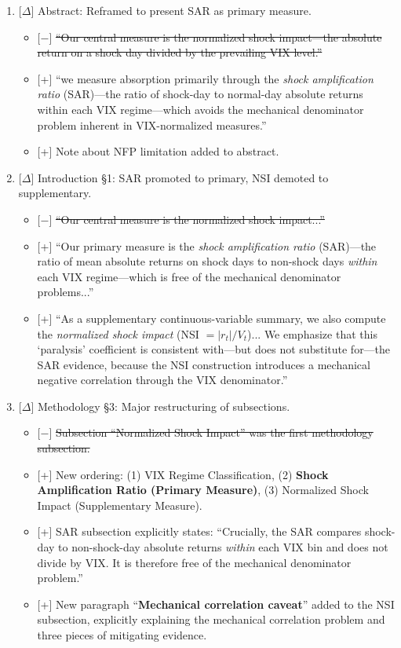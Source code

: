 \documentclass[12pt,a4paper]{article}
\newcommand{\added}[1]{\textcolor{addgreen}{[+] #1}}
\newcommand{\deleted}[1]{\textcolor{delred}{[$-$] \st{#1}}}
\newcommand{\modified}[1]{\textcolor{modblue}{[$\Delta$] #1}}
\begin{document}
\begin{enumerate}[leftmargin=*]

\item \modified{Abstract: Reframed to present SAR as primary measure.}
\begin{itemize}
\item \deleted{``Our central measure is the normalized shock impact---the absolute return on a shock day divided by the prevailing VIX level.''}
\item \added{``we measure absorption primarily through the \textit{shock amplification ratio} (SAR)---the ratio of shock-day to normal-day absolute returns within each VIX regime---which avoids the mechanical denominator problem inherent in VIX-normalized measures.''}
\item \added{Note about NFP limitation added to abstract.}
\end{itemize}

\item \modified{Introduction \S1: SAR promoted to primary, NSI demoted to supplementary.}
\begin{itemize}
\item \deleted{``Our central measure is the normalized shock impact...''}
\item \added{``Our primary measure is the \textit{shock amplification ratio} (SAR)---the ratio of mean absolute returns on shock days to non-shock days \textit{within} each VIX regime---which is free of the mechanical denominator problems...''}
\item \added{``As a supplementary continuous-variable summary, we also compute the \textit{normalized shock impact} (NSI $= |r_t|/V_t$)... We emphasize that this `paralysis' coefficient is consistent with---but does not substitute for---the SAR evidence, because the NSI construction introduces a mechanical negative correlation through the VIX denominator.''}
\end{itemize}

\item \modified{Methodology \S3: Major restructuring of subsections.}
\begin{itemize}
\item \deleted{Subsection ``Normalized Shock Impact'' was the first methodology subsection.}
\item \added{New ordering: (1) VIX Regime Classification, (2) \textbf{Shock Amplification Ratio (Primary Measure)}, (3) Normalized Shock Impact (Supplementary Measure).}
\item \added{SAR subsection explicitly states: ``Crucially, the SAR compares shock-day to non-shock-day absolute returns \textit{within} each VIX bin and does not divide by VIX. It is therefore free of the mechanical denominator problem.''}
\item \added{New paragraph ``\textbf{Mechanical correlation caveat}'' added to the NSI subsection, explicitly explaining the mechanical correlation problem and three pieces of mitigating evidence.}
\end{itemize}


\end{enumerate}
\end{document}
